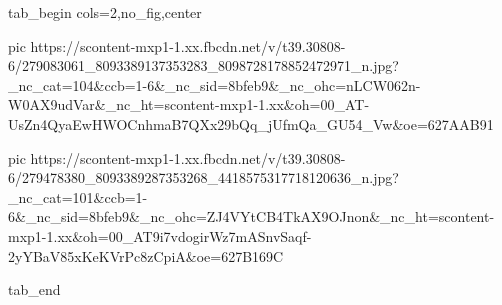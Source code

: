  
 
 
 
 


\ifcmt
  tab_begin cols=2,no_fig,center

     pic https://scontent-mxp1-1.xx.fbcdn.net/v/t39.30808-6/279083061_8093389137353283_8098728178852472971_n.jpg?_nc_cat=104&ccb=1-6&_nc_sid=8bfeb9&_nc_ohc=nLCW062n-W0AX9udVar&_nc_ht=scontent-mxp1-1.xx&oh=00_AT-UsZn4QyaEwHWOCnhmaB7QXx29bQq_jUfmQa_GU54_Vw&oe=627AAB91

     pic https://scontent-mxp1-1.xx.fbcdn.net/v/t39.30808-6/279478380_8093389287353268_4418575317718120636_n.jpg?_nc_cat=101&ccb=1-6&_nc_sid=8bfeb9&_nc_ohc=ZJ4VYtCB4TkAX9OJnon&_nc_ht=scontent-mxp1-1.xx&oh=00_AT9i7vdogirWz7mASnvSaqf-2yYBaV85xKeKVrPc8zCpiA&oe=627B169C

  tab_end
\fi
